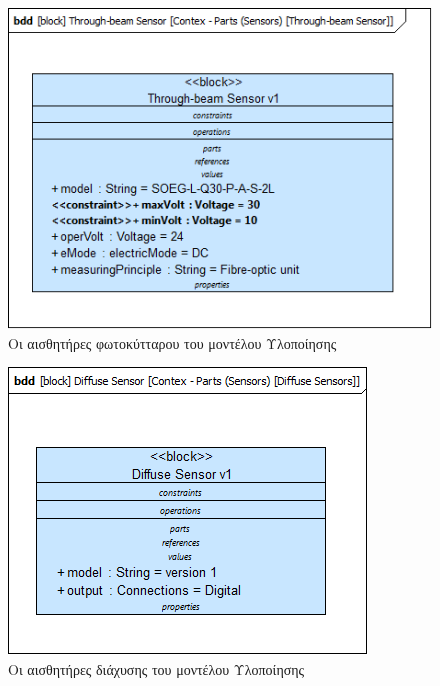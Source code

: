 \documentclass[a4paper,12pt,twoside]{report}
\begin{document}
\begin{appendices}
				\begin{figure}[hp]
					\centering
					\includegraphics[scale=0.50]{DesignModel_Contex-Parts(Sensors)[Through-beamSensor].png}
					\caption{Οι αισθητήρες φωτοκύτταρου του μοντέλου Υλοποίησης}
					\label{φωτ:Οι αισθητήρες φωτοκύτταρου του μοντέλου Υλοποίησης}
				\end{figure}
				
				\begin{figure}[hp]
					\centering
					\includegraphics[scale=0.50]{DesignModel_Contex-Parts(Sensors)[DiffuseSensors].png}
					\caption{Οι αισθητήρες διάχυσης του μοντέλου Υλοποίησης}
					\label{φωτ:Οι αισθητήρες διάχυσης του μοντέλου Υλοποίησης}
				\end{figure}
				

\end{appendices}
\end{document}
